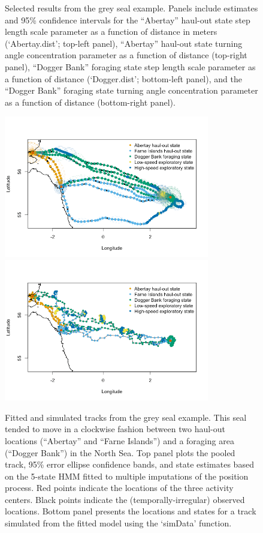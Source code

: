 \documentclass[12pt]{article}\usepackage[]{graphicx}\usepackage[]{color}
\begin{document}
\begin{figure}[htbp]
  \caption{Selected results from the grey seal example. Panels include estimates and 95\% confidence intervals for the ``Abertay'' haul-out state step length scale parameter as a function of distance in meters (`Abertay.dist'; top-left panel), ``Abertay'' haul-out state turning angle concentration parameter as a function of distance (top-right panel), ``Dogger Bank'' foraging state step length scale parameter as a function of distance (`Dogger.dist'; bottom-left panel), and the ``Dogger Bank'' foraging state turning angle concentration parameter as a function of distance (bottom-right panel).}
  \label{fig:greySealResults}
\end{figure}

\begin{figure}[htbp]
  \centering
    \includegraphics[width=0.8\textwidth]{plot_greySealResults1.png}\\
    \includegraphics[width=0.8\textwidth]{plot_greySealResults2.png}
  \caption{Fitted and simulated tracks from the grey seal example. This seal tended to move in a clockwise fashion between two haul-out locations (``Abertay'' and ``Farne Islands'') and a foraging area (``Dogger Bank'') in the North Sea. Top panel plots the pooled track, 95\% error ellipse confidence bands, and state estimates based on the 5-state HMM fitted to multiple imputations of the position process. Red points indicate the locations of the three activity centers. Black points indicate the (temporally-irregular) observed locations. Bottom panel presents the locations and states for a track simulated from the fitted model using the `simData' function.}
  \label{fig:greySealStateSims}
\end{figure}
\end{document}
